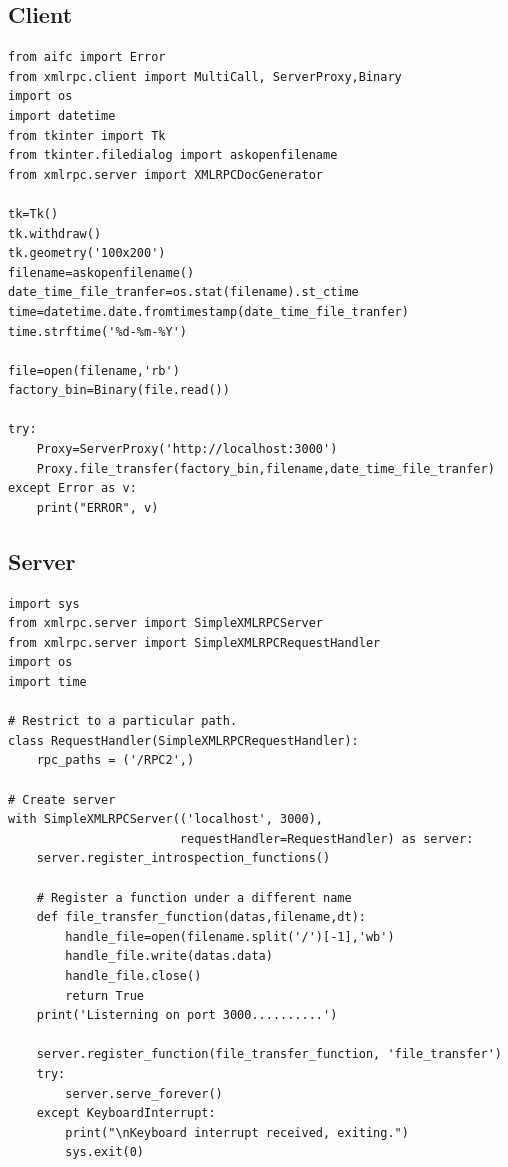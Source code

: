 \documentclass[12pt]{article}
\begin{document}
\subsection{Client}
\begin{verbatim}
from aifc import Error
from xmlrpc.client import MultiCall, ServerProxy,Binary
import os
import datetime
from tkinter import Tk
from tkinter.filedialog import askopenfilename
from xmlrpc.server import XMLRPCDocGenerator

tk=Tk()
tk.withdraw()
tk.geometry('100x200')
filename=askopenfilename()
date_time_file_tranfer=os.stat(filename).st_ctime
time=datetime.date.fromtimestamp(date_time_file_tranfer)
time.strftime('%d-%m-%Y')

file=open(filename,'rb')
factory_bin=Binary(file.read())

try:
    Proxy=ServerProxy('http://localhost:3000')
    Proxy.file_transfer(factory_bin,filename,date_time_file_tranfer)
except Error as v:
    print("ERROR", v)
\end{verbatim}

\subsection{Server}
\begin{verbatim}
import sys
from xmlrpc.server import SimpleXMLRPCServer
from xmlrpc.server import SimpleXMLRPCRequestHandler
import os
import time

# Restrict to a particular path.
class RequestHandler(SimpleXMLRPCRequestHandler):
    rpc_paths = ('/RPC2',)

# Create server
with SimpleXMLRPCServer(('localhost', 3000),
                        requestHandler=RequestHandler) as server:
    server.register_introspection_functions()

    # Register a function under a different name
    def file_transfer_function(datas,filename,dt):
        handle_file=open(filename.split('/')[-1],'wb')
        handle_file.write(datas.data)
        handle_file.close()
        return True
    print('Listerning on port 3000..........')
        
    server.register_function(file_transfer_function, 'file_transfer')
    try:
        server.serve_forever()
    except KeyboardInterrupt:
        print("\nKeyboard interrupt received, exiting.")
        sys.exit(0)
\end{verbatim}
\end{document}
